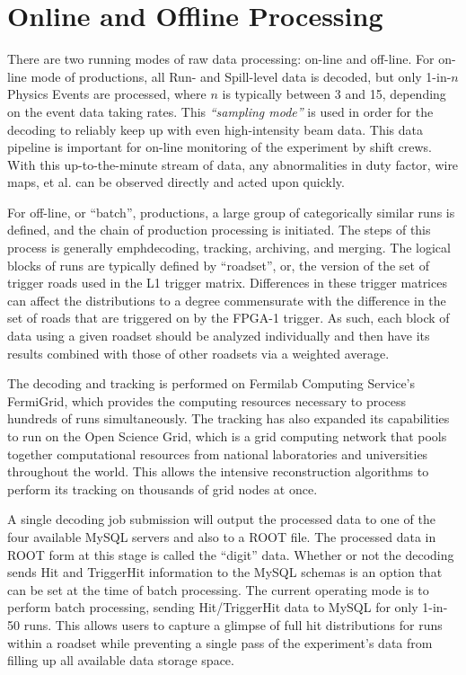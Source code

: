 
\section{Online and Offline Processing}

There are two running modes of raw data processing: on-line and off-line. For on-line mode of productions, all Run- and Spill-level data is decoded, but only 1-in-$n$ Physics Events are processed, where $n$ is typically between 3 and 15, depending on the event data taking rates. This \emph{``sampling mode''} is used in order for the decoding to reliably keep up with even high-intensity beam data. This data pipeline is important for on-line monitoring of the experiment by shift crews. With this up-to-the-minute stream of data, any abnormalities in duty factor, wire maps, et al. can be observed directly and acted upon quickly.

For off-line, or ``batch'', productions, a large group of categorically similar runs is defined, and the chain of production processing is initiated. The steps of this process is generally emph{decoding, tracking, archiving, and merging}. The logical blocks of runs are typically defined by ``roadset'', or, the version of the set of trigger roads used in the L1 trigger matrix. Differences in these trigger matrices can affect the distributions to a degree commensurate with the difference in the set of roads that are triggered on by the FPGA-1 trigger. As such, each block of data using a given roadset should be analyzed individually and then have its results combined with those of other roadsets via a weighted average.

The decoding and tracking is performed on Fermilab Computing Service's FermiGrid, which provides the computing resources necessary to process hundreds of runs simultaneously. The tracking has also expanded its capabilities to run on the Open Science Grid, which is a grid computing network that pools together computational resources from national laboratories and universities throughout the world\cite{osg:doc}. This allows the intensive reconstruction algorithms to perform its tracking on thousands of grid nodes at once.

A single decoding job submission will output the processed data to one of the four available MySQL servers and also to a ROOT file. The processed data in ROOT form at this stage is called the ``digit'' data. Whether or not the decoding sends Hit and TriggerHit information to the MySQL schemas is an option that can be set at the time of batch processing. The current operating mode is to perform batch processing, sending Hit/TriggerHit data to MySQL for only 1-in-50 runs. This allows users to capture a glimpse of full hit distributions for runs within a roadset while preventing a single pass of the experiment's data from filling up all available data storage space.

